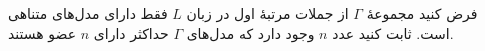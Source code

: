 فرض کنید مجموعهٔ
$\Gamma$
از جملات مرتبهٔ اول در زبان 
$L$
فقط دارای مدل‌های متناهی است. ثابت کنید عدد 
$n$
وجود دارد که مدل‌های 
$\Gamma$
حداکثر دارای 
$n$
عضو هستند.